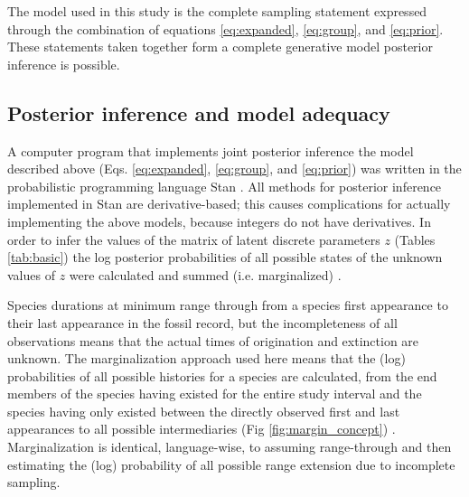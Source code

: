 \documentclass[12pt,letterpaper]{article}
\begin{document}
The model used in this study is the complete sampling statement expressed through the combination of equations \ref{eq:expanded}, \ref{eq:group}, and \ref{eq:prior}. These statements taken together form a complete generative model posterior inference is possible.



\subsection*{Posterior inference and model adequacy}
A computer program that implements joint posterior inference the model described above (Eqs. \ref{eq:expanded}, \ref{eq:group}, and \ref{eq:prior}) was written in the probabilistic programming language Stan \citep{StanDevelopmentTeam2016}. All methods for posterior inference implemented in Stan are derivative-based; this causes complications for actually implementing the above models, because integers do not have derivatives. In order to infer the values of the matrix of latent discrete parameters \(z\) (Tables \ref{tab:basic}) the log posterior probabilities of all possible states of the unknown values of \(z\) were calculated and summed (i.e. marginalized) \citep{StanDevelopmentTeam2016}. 

Species durations at minimum range through from a species first appearance to their last appearance in the fossil record, but the incompleteness of all observations means that the actual times of origination and extinction are unknown. The marginalization approach used here means that the (log) probabilities of all possible histories for a species are calculated, from the end members of the species having existed for the entire study interval and the species having only existed between the directly observed first and last appearances to all possible intermediaries (Fig \ref{fig:margin_concept}) \citep{StanDevelopmentTeam2016}. Marginalization is identical, language-wise, to assuming range-through and then estimating the (log) probability of all possible range extension due to incomplete sampling. %
\end{document}
